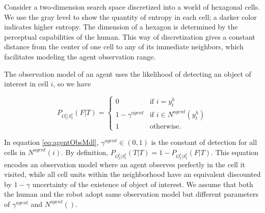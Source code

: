 \documentclass[12pt]{article}
\begin{document}
Consider a two-dimension search space discretized into a world of hexagonal cells.
We use the gray level to show the quantity of entropy in each cell; a darker color indicates higher entropy.
The dimension of a hexagon is determined by the perceptual capabilities of the human.
This way of discretization gives a constant distance from the center of one cell to any of its immediate neighbors, which facilitates modeling the agent observation range.

The observation model of an agent uses the likelihood of detecting an object of interest in cell $ i $, so we have

\begin{equation}
\label{eq:agentObsMdl}
P_{O^{i}_{t}|S^{i}_{t}}(F|T)=
\left\{
\begin{array}{lcl}
    0 & \mbox{if~} i=y^{h}_{t} \\
    1-\gamma^{agent} & \mbox{if~} i \in N^{agent}(y^{h}_{t}) \\
    1 & \mbox{otherwise.}
\end{array}
\right.
\end{equation}

In equation \eqref{eq:agentObsMdl}, $ \gamma^{agent} \in (0,1) $ is the constant of detection for all cells in $ N^{agent}(i) $.
By definition, $ P_{O^{i}_{t}|S^{i}_{t}}(T|T) = 1 - P_{O^{i}_{t}|S^{i}_{t}}(F|T) $.
This equation encodes an observation model where an agent observes perfectly in the cell it visited, while all cell units within the neighborhood have an equivalent discounted by $ 1-\gamma $ uncertainty of the existence of object of interest.
We assume that both the human and the robot adopt same observation model but different parameters of $ \gamma^{agent} $ and $ N^{agent}() $.
\end{document}

